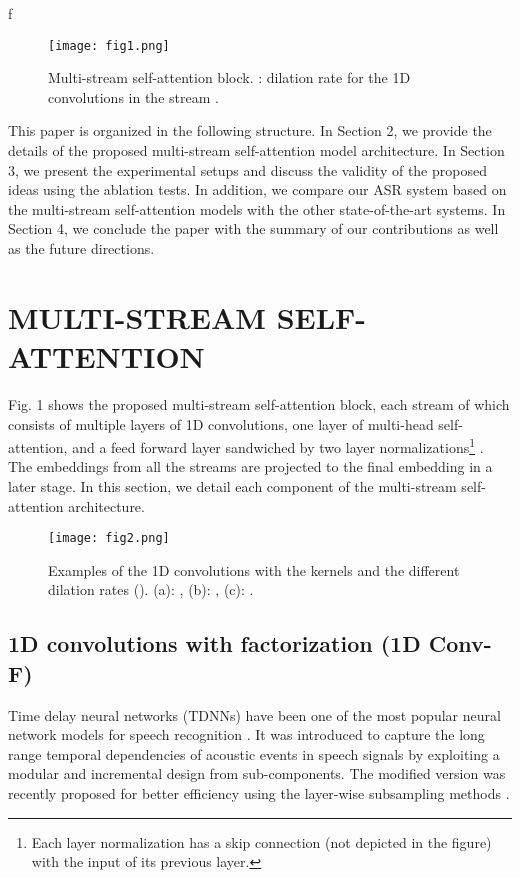 f\documentclass{article}
\begin{document}
\begin{figure}[t]
  \centering
  \centerline{\texttt{[image: fig1.png]}}
  \caption{Multi-stream self-attention block. : dilation rate for the 1D convolutions in the stream .}
\end{figure}

This paper is organized in the following structure. In Section 2, we provide the details of the proposed multi-stream self-attention model architecture. In Section 3, we present the experimental setups and discuss the validity of the proposed ideas using the ablation tests. In addition, we compare our ASR system based on the multi-stream self-attention models with the other state-of-the-art systems. In Section 4, we conclude the paper with the summary of our contributions as well as the future directions.

\section{MULTI-STREAM SELF-ATTENTION}
\label{sec:format}

Fig. 1 shows the proposed multi-stream self-attention block, each stream of which consists of multiple layers of 1D convolutions, one layer of multi-head self-attention, and a feed forward layer sandwiched by two layer normalizations\footnote{Each layer normalization has a skip connection (not depicted in the figure) with the input of its previous layer.} \cite{ln}. The embeddings from all the streams are projected to the final embedding in a later stage. In this section, we detail each component of the multi-stream self-attention architecture. 

\begin{figure}[t]
  \centering
  \centerline{\texttt{[image: fig2.png]}}
  \caption{Examples of the 1D convolutions with the  kernels and the different dilation rates (). (a): , (b): , (c): .}
\end{figure}

\subsection{1D convolutions with factorization (1D Conv-F)}
Time delay neural networks (TDNNs) have been one of the most popular neural network models for speech recognition \cite{tdnn,tdnn15povey}. It was introduced to capture the long range temporal dependencies of acoustic events in speech signals \cite{tdnn} by exploiting a modular and incremental design from sub-components. The modified version was recently proposed for better efficiency using the layer-wise subsampling methods \cite{tdnn15povey}. 
\end{document}
